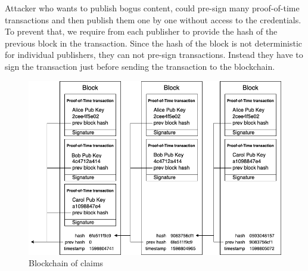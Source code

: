 Attacker who wants to publish bogus content, could pre-sign many proof-of-time transactions and then publish them one by one without access to the credentials. To prevent that, we require from each publisher to provide the hash of the previous block in the transaction. Since the hash of the block is not deterministic for individual publishers, they can not pre-sign transactions. Instead they have to sign the transaction just before sending the transaction to the blockchain.
\begin{figure}[h!]
\includegraphics[width=\textwidth]{img/blockchain_of_claims.png}
\centering
\caption{Blockchain of claims}
\label{fig:blockchain-of-claims}
\end{figure} 

